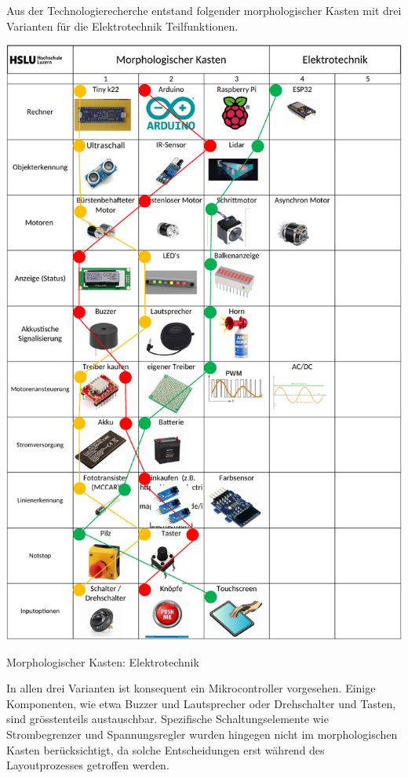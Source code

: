 Aus der Technologierecherche entstand folgender morphologischer Kasten mit drei Varianten für die Elektrotechnik Teilfunktionen.

\begin{table}[H]
\centering
\includegraphics[width=\textwidth -5mm]{assets/MK_Elektrotechnik.pdf}
\caption{Morphologischer Kasten: Elektrotechnik}
\label{table:mk-elektrotechnik}
\end{table}

In allen drei Varianten ist konsequent ein Mikrocontroller vorgesehen. Einige Komponenten, wie etwa Buzzer und Lautsprecher oder Drehschalter und Tasten, sind grösstenteils austauschbar. Spezifische Schaltungselemente wie Strombegrenzer und Spannungsregler wurden hingegen nicht im morphologischen Kasten berücksichtigt, da solche Entscheidungen erst während des Layoutprozesses getroffen werden.


